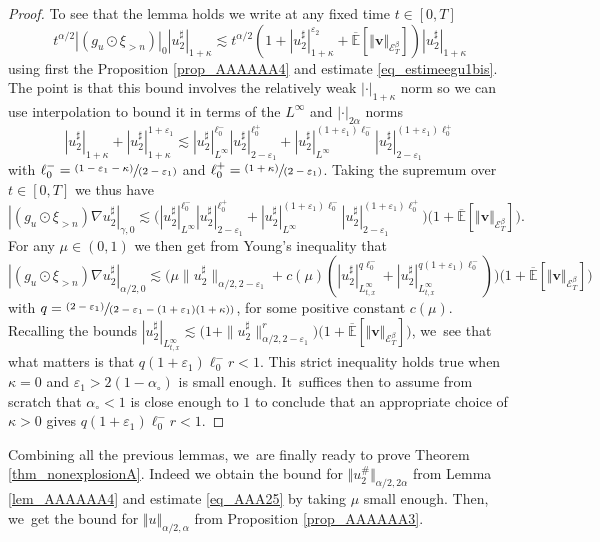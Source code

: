 \documentclass[JEP,XML,SOM,Unicode,published]{cedram}
\newcommand{\pspfrac}[2]{\sfrac{(#1)}{(#2)}}
\theoremstyle{definition}
\let\epsilon\varepsilon
\newcommand\bbE{\mathbb{E}}
\newcommand{\mcE}{\mathcal{E}}
\newcommand{\bsv}{\boldsymbol{v}}
\newcommand{\norme}[1]{\Vert #1 \Vert}
\begin{document}
\begin{proof}
To see that the lemma holds we write at any fixed time $t\in[0,T]$
\[
t^{\alpha / 2} | (g_u \odot \xi_{> n}) |_0 | u_2^{\sharp} |_{1 + \kappa} \lesssim t^{\alpha / 2} (1 + | u_2^{\sharp} |_{1 + \kappa}^{\epsilon_2} + \overline{\bbE}[\norme{\bsv}_{\mcE^\beta_T}] ) | u_2^{\sharp} |_{1 + \kappa}
\]
using first the Proposition \ref{prop_AAAAAA4} and estimate \eqref{eq_estimeegu1bis}. The point is that this bound involves the relatively weak $| \cdot |_{1 + \kappa}$ norm so we can use interpolation
to bound it in terms of the $L^{\infty}$ and $| \cdot |_{2 \alpha}$ norms
\[
| u_2^{\sharp} |_{1 + \kappa} + | u_2^{\sharp} |_{1 + \kappa}^{1 +
\epsilon_1} \lesssim | u_2^{\sharp} |_{L^{\infty}}^{\ell_0^-} |
u_2^{\sharp} |_{2 - \epsilon_1}^{\ell_0^+} + | u_2^{\sharp}
|_{L^{\infty}}^{(1 + \epsilon_1) \ell_0^-} | u_2^{\sharp} |_{2 -
\epsilon_1}^{(1 + \epsilon_1) \ell_0^+}
\]
with $\ell_0^- = \pspfrac{1 - \epsilon_1 - \kappa}{2 - \epsilon_1}$ and $\ell_0^+ = \pspfrac{1 + \kappa}{2 - \epsilon_1}$. Taking the supremum over $t\in[0,T]$ we thus have
\[
| (g_u \odot \xi_{> n}) \nabla u_2^{\sharp} |_{\gamma, 0} \lesssim \bigl( |
u_2^{\sharp} |_{L^{\infty}}^{\ell_0^-} | u_2^{\sharp} |_{2 -
\epsilon_1}^{\ell_0^+} + | u_2^{\sharp} |_{L^{\infty}}^{(1 + \epsilon_1)
\ell_0^-} | u_2^{\sharp} |_{2 - \epsilon_1}^{(1 + \epsilon_1) \ell_0^+}\bigr) \bigl(1+\overline{\bbE}[\norme{\bsv}_{\mcE^\beta_T}]\bigr).
\]
For any $\mu\in(0,1)$ we then get from Young's inequality that
\[
| (g_u \odot \xi_{> n}) \nabla u_2^{\sharp} |_{\alpha / 2, 0} \lesssim \bigl(\mu
\| u_2^{\sharp} \|_{\alpha / 2, 2 - \epsilon_1} + c (\mu) (| u_2^{\sharp}
|^{q \ell_0^-}_{L^{\infty}_{t, x}} + | u_2^{\sharp} |^{q (1 + \epsilon_1)
\ell_0^-}_{L^{\infty}_{t, x}}) \bigr) \bigl(1+\overline{\bbE}[\norme{\bsv}_{\mcE^\beta_T}]\bigr)
\]
with $q = \pspfrac{2 - \epsilon_1}{2 - \epsilon_1 - (1 + \epsilon_1) (1 + \kappa)}$, for some positive constant $c (\mu)$. Recalling the bounds $| u_2^{\sharp} |_{L^{\infty}_{t, x}} \lesssim \bigl(1 + \| u_2^{\sharp} \|^r_{\alpha / 2, 2 - \epsilon_1}\bigr) \bigl(1+\overline{\bbE}[\norme{\bsv}_{\mcE^\beta_T}]\bigr)$, we~see that what matters is that $q(1 + \epsilon_1) \ell_0^- r < 1$. This strict inequality holds true when $\kappa = 0$ and $\epsilon_1 > 2 (1 - \alpha_{\circ})$ is small enough. It~suffices then to assume from scratch that $\alpha_{\circ} < 1$ is close enough to $1$ to conclude that an appropriate choice of $\kappa > 0$ gives $q (1 + \epsilon_1) \ell_0^- r < 1$.
\end{proof}

Combining all the previous lemmas, we~are finally ready to prove Theorem \ref{thm_nonexplosionA}. Indeed we obtain the bound for $\norme{u_2^\#}_{\alpha/2,2\alpha}$ from Lemma \ref{lem_AAAAAA4} and estimate \eqref{eq_AAA25} by taking $\mu$ small enough. Then, we~get the bound for $\norme{u}_{\alpha/2,\alpha}$ from Proposition \ref{prop_AAAAAA3}.




\end{document}
